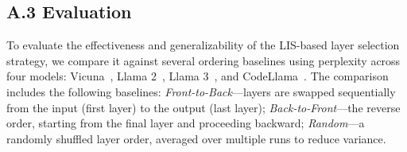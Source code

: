 \subsection*{A.3 \quad Evaluation}\label{appendix:eval}

To evaluate the effectiveness and generalizability of the LIS-based layer selection strategy, we compare it against several ordering baselines using perplexity across four models: Vicuna~\cite{vicuna_7b_v1.5}, Llama 2~\cite{touvron2023llama2}, Llama 3~\cite{grattafiori2024llama3}, and CodeLlama~\cite{roziere2023codellama}. 
The comparison includes the following baselines:
\emph{Front-to-Back}---layers are swapped sequentially from the input (first layer) to the output (last layer);
\emph{Back-to-Front}---the reverse order, starting from the final layer and proceeding backward; 
\emph{Random}---a randomly shuffled layer order, averaged over multiple runs to reduce variance. 
\vspace{-5pt}

